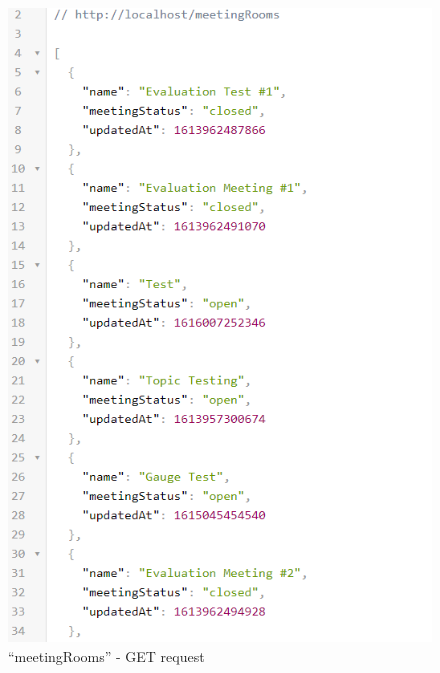 \documentclass{article}
\begin{document}
\begin{figure}[H]
\centering
\begin{minipage}{.48\textwidth}
  \centering
  \includegraphics[width=1\linewidth]{implementation/meetingRooms.png}
  \caption{``meetingRooms'' - GET request}
  \label{fig:meetingRooms}
\end{minipage}
\begin{minipage}{.48\textwidth}
  \centering

\end{minipage}
\end{figure}
\end{document}
